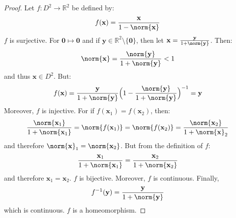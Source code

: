 \documentclass[crop=false,class=book,oneside]{standalone}                      %
\begin{document}
            \begin{proof}
                Let $f:D^{2}\rightarrow\mathbb{R}^{2}$
                be defined by:
                \begin{equation}
                    f(\mathbf{x})=\frac{\mathbf{x}}{1-\norm{\mathbf{x}}}
                \end{equation}
                $f$ is surjective. For $\mathbf{0}\mapsto\mathbf{0}$ and if
                $\mathbf{y}\in\mathbb{R}^2\setminus\{\mathbf{0}\}$, then let
                $\mathbf{x}=\frac{\mathbf{y}}{1+\norm{\mathbf{y}}}$. Then:
                \begin{equation}
                    \norm{\mathbf{x}}
                    =\frac{\norm{\mathbf{y}}}{1+\norm{\mathbf{y}}}<1
                \end{equation}
                and thus $\mathbf{x}\in D^{2}$. But:
                \begin{equation}
                    f(\mathbf{x})
                    =\frac{\mathbf{y}}{1+\norm{\mathbf{y}}}
                    \Big(
                        1-\frac{\norm{\mathbf{y}}}{1+\norm{\mathbf{y}}}
                    \Big)^{-1}
                    =\mathbf{y}
                \end{equation}
                Moreover, $f$ is injective.
                For if
                $f(\mathbf{x}_{1})=f(\mathbf{x}_{2})$,
                then:
                \begin{equation}
                    \frac{\norm{\mathbf{x}_{1}}}{1+\norm{\mathbf{x}_{1}}}
                    =\norm{f(\mathbf{x}_{1})}
                    =\norm{f(\mathbf{x}_{2})}
                    =\frac{\norm{\mathbf{x}_{2}}}{1+\norm{\mathbf{x}}_{2}}
                \end{equation}
                and therefore
                $\norm{\mathbf{x}}_{1}=\norm{\mathbf{x}_{2}}$.
                But from the definition of $f$:
                \begin{equation}
                    \frac{\mathbf{x}_{1}}{1+\norm{\mathbf{x}_{1}}}
                    =\frac{\mathbf{x}_{2}}{1+\norm{\mathbf{x}_{2}}}
                \end{equation}
                and therefore $\mathbf{x}_{1}=\mathbf{x}_{2}$.
                $f$ is bijective.
                Moreover, $f$ is continuous. Finally,
                \begin{equation}
                    f^{-1}(\mathbf{y})
                    =\frac{\mathbf{y}}{1+\norm{\mathbf{y}}}                    
                \end{equation}
                which is continuous. $f$ is a homeomorphism.
            \end{proof}
\end{document}
